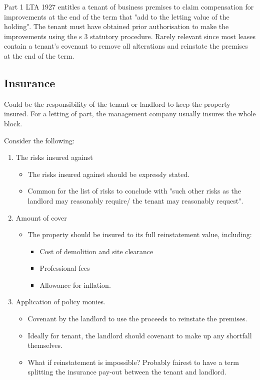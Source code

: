 \documentclass[
]{article}
\providecommand{\tightlist}{%
  \setlength{\itemsep}{0pt}\setlength{\parskip}{0pt}}
\begin{document}
Part 1 LTA 1927 entitles a tenant of business premises to claim
compensation for improvements at the end of the term that "add to the
letting value of the holding". The tenant must have obtained prior
authorisation to make the improvements using the s 3 statutory
procedure. Rarely relevant since most leases contain a tenant's covenant
to remove all alterations and reinstate the premises at the end of the
term.

\hypertarget{insurance}{%
\subsection{Insurance}\label{insurance}}

Could be the responsibility of the tenant or landlord to keep the
property insured. For a letting of part, the management company usually
insures the whole block.

Consider the following:

\begin{enumerate}
\tightlist
\item
  The risks insured against

  \begin{itemize}
  \tightlist
  \item
    The risks insured against should be expressly stated.
  \item
    Common for the list of risks to conclude with "such other risks as
    the landlord may reasonably require/ the tenant may reasonably
    request".
  \end{itemize}
\item
  Amount of cover

  \begin{itemize}
  \tightlist
  \item
    The property should be insured to its full reinstatement value,
    including:

    \begin{itemize}
    \tightlist
    \item
      Cost of demolition and site clearance
    \item
      Professional fees
    \item
      Allowance for inflation.
    \end{itemize}
  \end{itemize}
\item
  Application of policy monies.

  \begin{itemize}
  \tightlist
  \item
    Covenant by the landlord to use the proceeds to reinstate the
    premises.
  \item
    Ideally for tenant, the landlord should covenant to make up any
    shortfall themselves.
  \item
    What if reinstatement is impossible? Probably fairest to have a term
    splitting the insurance pay-out between the tenant and landlord.
  \end{itemize}
\end{enumerate}
\end{document}
